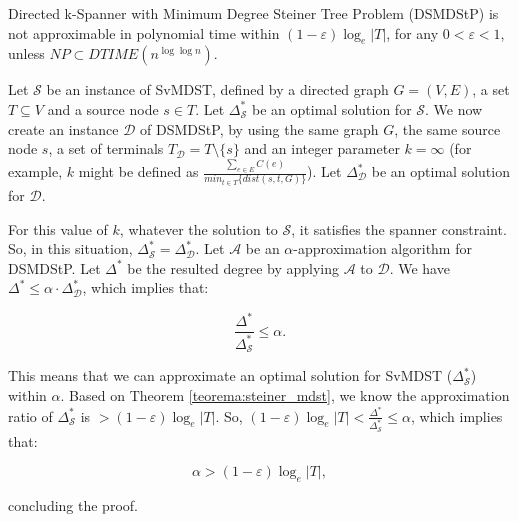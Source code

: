 \begin{Claim}
  Directed k-Spanner with Minimum Degree Steiner Tree Problem (DSMDStP) is not approximable in polynomial
time within $(1-\varepsilon)\log_e |T|$, for any $0 < \varepsilon < 1$, unless $NP \subset DTIME(n^{\log \log{n}})$.
\end{Claim}
  \begin{Proof}
Let $\mathcal{S}$ be an instance of SvMDST, defined by a directed graph $G = (V,E)$, a set $T \subseteq V$ and a source node $s \in T$. 
Let $\Delta_\mathcal{S}^*$ be an optimal solution for $\mathcal{S}$. 
We now create an instance $\mathcal{D}$ of DSMDStP, by using the same graph $G$, the same source node $s$,
a set of terminals $T_\mathcal{D} = T \setminus \lbrace s \rbrace$ and an integer parameter $k=\infty$
(for example, $k$ might be defined as $\frac{\sum_{e \in E} C(e)}{min_{t\in T}\{dist(s,t,G)\}}$).
Let $\Delta_\mathcal{D}^*$ be an optimal solution for $\mathcal{D}$. 

For this value of $k$, whatever the solution to $\mathcal{S}$, it satisfies the spanner constraint. 
So, in this situation, \mbox{$\Delta_\mathcal{S}^* = \Delta_\mathcal{D}^*$}. 
Let $\mathcal{A}$ be an $\alpha$-approximation algorithm for DSMDStP. Let $\Delta^*$ be the resulted degree by applying $\mathcal{A}$ to $\mathcal{D}$. We have $\Delta^* \le \alpha \cdot \Delta_\mathcal{D}^*$, which implies that:

\begin{equation}
\label{eq:hardness_proof_relation}
  \frac{\Delta^*}{\Delta_\mathcal{S}^*} \le \alpha.
\end{equation}

This means that we can approximate an optimal solution for SvMDST ($\Delta_\mathcal{S}^*$) within $\alpha$. Based on Theorem \ref{teorema:steiner_mdst}, 
we know the approximation ratio of $\Delta_\mathcal{S}^*$ is $ > (1-\varepsilon)\log_e |T|$. So, $(1-\varepsilon)\log_e |T| < \frac{\Delta^*}{\Delta_\mathcal{S}^*} \leq \alpha$, 
which implies that:

\begin{equation}
  \alpha > (1-\varepsilon)\log_e |T|,
\end{equation}

concluding the proof.
  \end{Proof}


